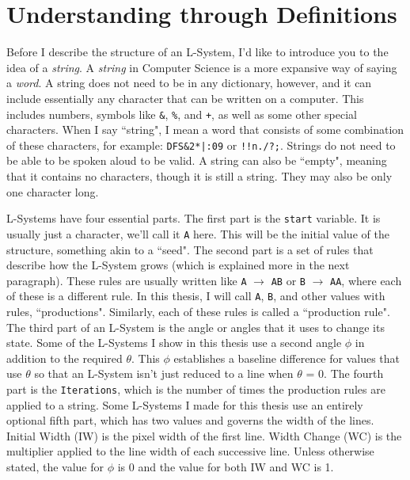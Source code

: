 \documentclass[12pt,twoside]{reedthesis}
\newcommand{\code}[1]{\texttt{#1}}
\begin{document}
\section{Understanding through Definitions}
\label{Understanding-through-Definitions}

	Before I describe the structure of an L-System, I'd like to introduce you to the idea of a \textit{string}. A \textit{string} in Computer Science is a more expansive way of saying a \textit{word}. A string does not need to be in any dictionary, however, and it can include essentially any character that can be written on a computer. This includes numbers, symbols like \code{\&}, \code{\%}, and \code{+}, as well as some other special characters. When I say ``string", I mean a word that consists of some combination of these characters, for example: \code{DFS\&2*|:09} or \code{!!n./?;}. Strings do not need to be able to be spoken aloud to be valid. A string can also be ``empty", meaning that it contains no characters, though it is still a string. They may also be only one character long.
	
	L-Systems have four essential parts. The first part is the \code{start} variable. It is usually just a character, we'll call it \code{A} here. This will be the initial value of the structure, something akin to a ``seed". The second part is a set of rules that describe how the L-System grows (which is explained more in the next paragraph). These rules are usually written like \code{A} $\rightarrow$ \code{AB} or \code{B} $\rightarrow$ \code{AA}, where each of these is a different rule. In this thesis, I will call \code{A}, \code{B}, and other values with rules, ``productions". Similarly, each of these rules is called a ``production rule". The third part of an L-System is the angle or angles that it uses to change its state. Some of the L-Systems I show in this thesis use a second angle $\phi$ in addition to the required $\theta$. This $\phi$ establishes a baseline difference for values that use $\theta$ so that an L-System isn't just reduced to a line when $\theta$ = 0. The fourth part is the \code{Iterations}, which is the number of times the production rules are applied to a string. Some L-Systems I made for this thesis use an entirely optional fifth part, which has two values and governs the width of the lines. Initial Width (IW) is the pixel width of the first line. Width Change (WC) is the multiplier applied to the line width of each successive line. Unless otherwise stated, the value for $\phi$ is 0 and the value for both IW and WC is 1.
	
\end{document}
